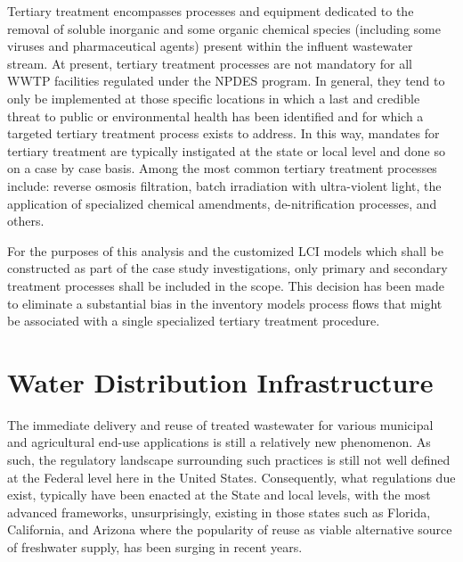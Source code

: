 Tertiary treatment encompasses processes and equipment dedicated to the removal of soluble inorganic and some organic chemical species (including some viruses and pharmaceutical agents) present within the influent wastewater stream. At present, tertiary treatment processes are not mandatory for all WWTP facilities regulated under the NPDES program. In general, they tend to only be implemented at those specific locations in which a last and credible threat to public or environmental health has been identified and for which a targeted tertiary treatment process exists to address. In this way, mandates for tertiary treatment are typically instigated at the state or local level and done so on a case by case basis. Among the most common tertiary treatment processes include: reverse osmosis filtration, batch irradiation with ultra-violent light, the application of specialized chemical amendments, de-nitrification processes, and others.

For the purposes of this analysis and the customized LCI models which shall be constructed as part of the case study investigations, only primary and secondary treatment processes shall be included in the scope. This decision has been made to eliminate a substantial bias in the inventory models process flows that might be associated with a single specialized tertiary treatment procedure.  

\section{Water Distribution Infrastructure}

The immediate delivery and reuse of treated wastewater for various municipal and agricultural end-use applications is still a relatively new phenomenon. As such, the regulatory landscape surrounding such practices is still not well defined at the Federal level here in the United States. Consequently, what regulations due exist, typically have been enacted at the State and local levels, with the most advanced frameworks, unsurprisingly, existing in those states such as Florida, California, and Arizona where the popularity of reuse as viable alternative source of freshwater supply, has been surging in recent years.


